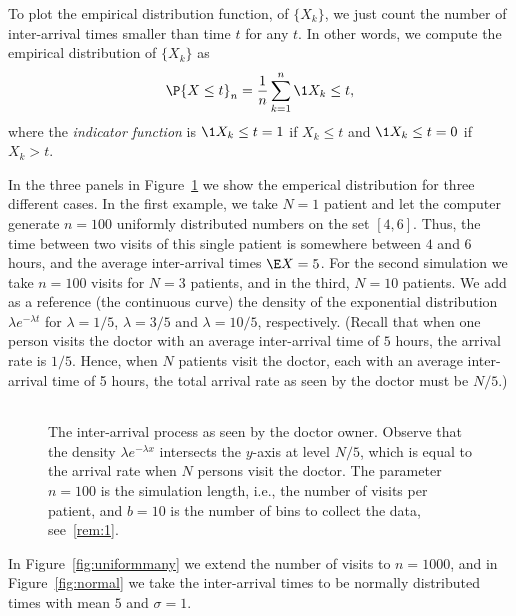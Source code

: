 To plot the empirical distribution function, of $\{X_k\}$, we just count the number of inter-arrival times smaller than time $t$ for any $t$.
In other words, we compute  the empirical distribution of $\{X_k\}$  as
\begin{equation*}
  \P{X \leq t}_{n} = \frac1{n}\sum_{k=1}^{n} \1{X_k\leq t},
\end{equation*}
where the \emph{indicator function} is $\1{X_k\leq t}=1$ if $X_k\leq t$ and $\1{X_k\leq t}=0$
if $X_k> t$.

In the three panels in Figure~\ref{fig:uniformfew} we show the emperical distribution for three different cases.
In the first example, we take $N=1$ patient and let the computer generate $n=100$ uniformly distributed numbers on the set $[4, 6]$.
Thus, the time between two visits of this single patient is somewhere between $4$ and $6$ hours, and the average inter-arrival times $\E X = 5$.
For the  second simulation we take $n=100$ visits for $N=3$ patients, and in the third, $N=10$ patients.  We add as a reference (the continuous curve) the density of the exponential distribution $\lambda e^{-\lambda t}$ for $\lambda=1/5$, $\lambda=3/5$ and $\lambda=10/5$, respectively.
(Recall that when one person visits the doctor with an average inter-arrival time of $5$ hours, the arrival rate is $1/5$.
Hence, when $N$ patients visit the doctor, each with an average inter-arrival time of 5 hours, the total arrival rate as seen by the doctor must be $N/5$.)


\begin{figure}[ht]
  \centering
  \begin{tabular}[h]{c}
 \\
  \end{tabular}
  \caption{The inter-arrival process as seen by the doctor owner. Observe
    that the density $\lambda e^{-\lambda x}$ intersects the $y$-axis
    at level $N/5$, which is equal to the arrival rate when $N$
    persons visit the doctor. The parameter $n=100$ is the simulation
    length, i.e., the number of visits per patient, and $b=10$ is the
    number of bins to collect the data, see~\cref{rem:1}.}
  \label{fig:uniformfew}
\end{figure}

In Figure~\ref{fig:uniformmany} we extend the number of visits to $n=1000$, and in Figure~\ref{fig:normal} we take the inter-arrival times to be normally distributed times with mean $5$ and $\sigma=1$.


